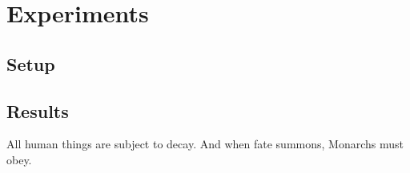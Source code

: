 \documentclass{scrartcl}
\begin{document}
    \section{Experiments}
    \subsection{Setup}
    \subsection{Results}
    All human things are subject to decay. And when fate summons, Monarchs must obey.

    \printbibliography
\end{document}
